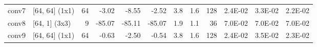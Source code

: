 \begin{table}
\begin{tabular}{llrrrrrrrrrr}
conv7 & [64, 64] (1x1) & 64 & {\cellcolor[HTML]{EFF8AA}} \color[HTML]{000000} -3.02 & {\cellcolor[HTML]{FEFFBE}} \color[HTML]{000000} -8.55 & {\cellcolor[HTML]{EFF8AA}} \color[HTML]{000000} -2.52 & 3.8 & 1.6 & 128 & {\cellcolor[HTML]{FFF1A8}} \color[HTML]{000000} 2.4E-02 & {\cellcolor[HTML]{FED07E}} \color[HTML]{000000} 3.3E-02 & {\cellcolor[HTML]{FFF7B2}} \color[HTML]{000000} 2.2E-02 \\
conv8 & [64, 1] (3x3) & 9 & {\cellcolor[HTML]{A50026}} \color[HTML]{F1F1F1} -85.07 & {\cellcolor[HTML]{A50026}} \color[HTML]{F1F1F1} -85.11 & {\cellcolor[HTML]{A50026}} \color[HTML]{F1F1F1} -85.07 & 1.9 & 1.1 & 36 & {\cellcolor[HTML]{A50026}} \color[HTML]{F1F1F1} 7.0E-02 & {\cellcolor[HTML]{A50026}} \color[HTML]{F1F1F1} 7.0E-02 & {\cellcolor[HTML]{A50026}} \color[HTML]{F1F1F1} 7.0E-02 \\
conv9 & [64, 64] (1x1) & 64 & {\cellcolor[HTML]{E9F6A1}} \color[HTML]{000000} -0.63 & {\cellcolor[HTML]{EFF8AA}} \color[HTML]{000000} -2.50 & {\cellcolor[HTML]{E9F6A1}} \color[HTML]{000000} -0.54 & 3.8 & 1.6 & 128 & {\cellcolor[HTML]{FFF0A6}} \color[HTML]{000000} 2.4E-02 & {\cellcolor[HTML]{FEC877}} \color[HTML]{000000} 3.5E-02 & {\cellcolor[HTML]{FFF5AE}} \color[HTML]{000000} 2.3E-02 \\
\bottomrule
\end{tabular}
\end{table}
